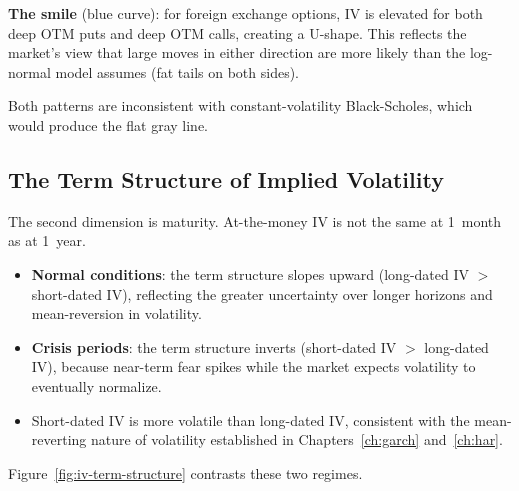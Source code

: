 \textbf{The smile} (blue curve): for foreign exchange options, IV is elevated for both deep OTM puts and deep OTM calls, creating a U-shape.
This reflects the market's view that large moves in either direction are more likely than the log-normal model assumes (fat tails on both sides).

Both patterns are inconsistent with constant-volatility Black-Scholes, which would produce the flat gray line.

\subsection{The Term Structure of Implied Volatility}
\label{sec:iv-term-structure}

The second dimension is maturity.
At-the-money IV is not the same at 1~month as at 1~year.

\begin{keyidea}
\begin{itemize}[nosep]
  \item \textbf{Normal conditions}: the term structure slopes upward (long-dated IV $>$ short-dated IV), reflecting the greater uncertainty over longer horizons and mean-reversion in volatility.
  \item \textbf{Crisis periods}: the term structure inverts (short-dated IV $>$ long-dated IV), because near-term fear spikes while the market expects volatility to eventually normalize.
  \item Short-dated IV is more volatile than long-dated IV, consistent with the mean-reverting nature of volatility established in Chapters~\ref{ch:garch} and~\ref{ch:har}.
\end{itemize}
\end{keyidea}

Figure~\ref{fig:iv-term-structure} contrasts these two regimes.

